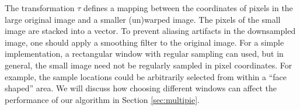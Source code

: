 \documentclass[12pt,journal,draftcls,letterpaper,onecolumn]{IEEEtran}
\begin{document}
The transformation $\tau$ defines a mapping between the
coordinates of pixels in the large original image and a smaller
(un)warped image. The pixels of the small image are stacked into a vector. To prevent aliasing
artifacts in the downsampled image, one should apply a
smoothing filter to the original image. For a simple implementation, a rectangular window with
regular sampling can used, but in general, the small image need
not be regularly sampled in pixel coordinates.  For example,
the sample locations could be arbitrarily selected from within a
``face shaped'' area. We will discuss how choosing
different windows can affect the performance of our algorithm
in Section \ref{sec:multipie}. 
\end{document}
